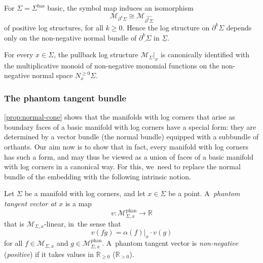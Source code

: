 \documentclass[JEP,XML,SOM,Unicode,NoFloatCountersInSection,published]{cedram}
\theoremstyle{definition}
\theoremstyle{remark}
\let\defn\emph
\newcommand{\RR}{\mathbb{R}}
\renewcommand{\ge}{\geqslant}
\newcommand{\cM}{\mathscr{M}}
\newcommand{\cMphan}{\mathscr{M}^{\mathrm{phan}}}
\newcommand{\Sig}{\Sigma}
\newcommand{\uSig}{\underline{\Sigma}}
\newcommand{\bas}[1]{{#1}^{\mathrm{bas}}}
\newcommand{\Sigbas}{\bas{\Sig}}
\newcommand{\ubdSig}[1][]{\underline{\partial^{#1}\Sigma}}
\newcommand{\bdSig}[1][]{\partial^{#1}\Sigma}
\begin{document}
\begin{proposition}\label{prop:normal-cone}
For $\Sig=\Sigbas$ basic, the symbol map induces an isomorphism
\[
\cM_{\bdSig[k]} \cong \cM_{\widehat{\bdSig[k]}}
\]
of positive log structures, for all $k \ge 0$. Hence the log structure on $\bdSig[k]$ depends only on the non-negative normal bundle of $\ubdSig[k]$ in $\uSig$.
\end{proposition}

\begin{corollary}\label{cor:normal-monoid}
For every $x \in \Sig$, the pullback log structure $\cM_{\Sig}|_x$ is canonically identified with the multiplicative monoid of non-negative monomial functions on the non-negative normal space $N^{\ge0}_x\Sig$.
\end{corollary}

\subsubsection{The phantom tangent bundle}\label{sec:phantom-tangent}

\autoref{prop:normal-cone} shows that the manifolds with log corners that arise as boundary faces of a basic manifold with log corners have a special form: they are determined by a vector bundle (the normal bundle) equipped with a subbundle of orthants. Our aim now is to show that in fact, every manifold with log corners has such a form, and may thus be viewed as a union of faces of a basic manifold with log corners in a canonical way. For this, we~need to replace the normal bundle of the embedding with the following intrinsic notion.
\begin{definition}
Let $\Sig$ be a manifold with log corners, and let $x \in \Sig$ be a point. A~\defn{phantom tangent vector at $x$} is a map
\[
v \colon \cMphan_{\Sig,x} \to \RR
\]
that is $\cM_{\Sig,x}$-linear, in~the sense that
\[
v(fg) = \alpha(f)|_x \cdot v(g)
\]
for all $f \in \cM_{\Sig,x}$ and $g \in \cMphan_{\Sig,x}$. A~phantom tangent vector is \defn{non-negative} (\resp \defn{positive}) if it takes values in $\RR_{\ge0}$ (\resp $\RR_{>0}$).
\end{definition}
\end{document}
